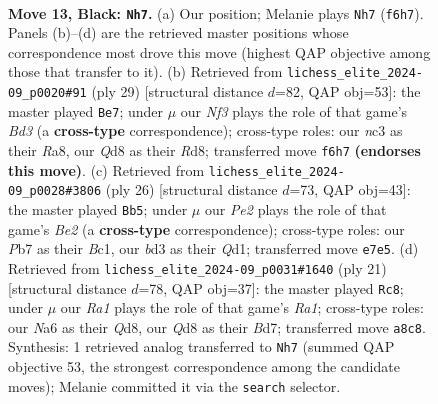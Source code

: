 \documentclass[11pt]{article}
\begin{document}
\clearpage

\begin{figure}[p]\centering
\begin{subfigure}{0.46\textwidth}\centering
\resizebox{\linewidth}{!}{%
\newchessgame
\chessboard[
  setfen={r2qkb1r/pp1bpp2/n2p1np1/1N5p/4P3/2NBBP2/PPP2QPP/2K1R2R b kq - 1 13},
  showmover=false,
  pgfstyle=straightmove, color=movearrow, markmove={f6-h7}
]}
\caption{}
\end{subfigure}\hfill
\begin{subfigure}{0.46\textwidth}\centering
\resizebox{\linewidth}{!}{%
\newchessgame
\chessboard[
  setfen={r2r2k1/ppqb1ppp/2pb1nn1/8/3BP3/2N2NPP/PPQ2PB1/R3R1K1 b - - 0 15},
  showmover=false,
  pgfstyle=straightmove, color=movearrow, markmove={d6-e7}
]}
\caption{}
\end{subfigure}
\\[4pt]
\begin{subfigure}{0.46\textwidth}\centering
\resizebox{\linewidth}{!}{%
\newchessgame
\chessboard[
  setfen={r1bq1rk1/pp4pp/2nbpn2/2pp4/3P4/2P2NN1/PP2BPPP/R1BQR1K1 w - - 3 14},
  showmover=false,
  pgfstyle=straightmove, color=movearrow, markmove={e2-b5}
]}
\caption{}
\end{subfigure}\hfill
\begin{subfigure}{0.46\textwidth}\centering
\resizebox{\linewidth}{!}{%
\newchessgame
\chessboard[
  setfen={r2qk2r/1p1bppbp/p1np2p1/6Pn/3NP3/2N1B3/PPPQ1P1P/2KR1BR1 b kq - 6 11},
  showmover=false,
  pgfstyle=straightmove, color=movearrow, markmove={a8-c8}
]}
\caption{}
\end{subfigure}
\caption{\textbf{Move 13, Black: \texttt{Nh7}.} (a) Our position; Melanie plays \texttt{Nh7} (\texttt{f6h7}). Panels (b)--(d) are the retrieved master positions whose correspondence most drove this move (highest QAP objective among those that transfer to it). (b) Retrieved from \texttt{lichess\_elite\_2024-09\_p0020\#91} (ply 29) [structural distance $d$=82, QAP obj=53]: the master played \texttt{Be7}; under $\mu$ our \emph{Nf3} plays the role of that game's \emph{Bd3} (a \textbf{cross-type} correspondence); cross-type roles: our \emph{n}c3 as their \emph{R}a8, our \emph{Q}d8 as their \emph{R}d8; transferred move \texttt{f6h7} \textbf{(endorses this move)}. (c) Retrieved from \texttt{lichess\_elite\_2024-09\_p0028\#3806} (ply 26) [structural distance $d$=73, QAP obj=43]: the master played \texttt{Bb5}; under $\mu$ our \emph{Pe2} plays the role of that game's \emph{Be2} (a \textbf{cross-type} correspondence); cross-type roles: our \emph{P}b7 as their \emph{B}c1, our \emph{b}d3 as their \emph{Q}d1; transferred move \texttt{e7e5}. (d) Retrieved from \texttt{lichess\_elite\_2024-09\_p0031\#1640} (ply 21) [structural distance $d$=78, QAP obj=37]: the master played \texttt{Rc8}; under $\mu$ our \emph{Ra1} plays the role of that game's \emph{Ra1}; cross-type roles: our \emph{N}a6 as their \emph{Q}d8, our \emph{Q}d8 as their \emph{B}d7; transferred move \texttt{a8c8}. Synthesis: 1 retrieved analog transferred to \texttt{Nh7} (summed QAP objective 53, the strongest correspondence among the candidate moves); Melanie committed it via the \texttt{search} selector.}
\label{fig:thought-m25}
\end{figure}
\end{document}
